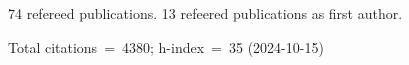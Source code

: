 74 refereed publications. 13 refeered publications as first author.

Total citations~=~4380; h-index~=~35 (2024-10-15)